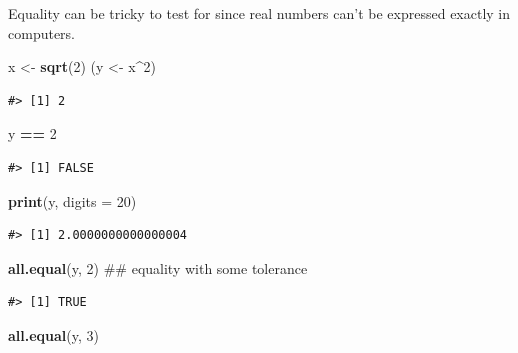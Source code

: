 \documentclass[]{book}
\newenvironment{Shaded}{\begin{snugshade}}{\end{snugshade}}
\newcommand{\KeywordTok}[1]{\textcolor[rgb]{0.13,0.29,0.53}{\textbf{#1}}}
\newcommand{\DataTypeTok}[1]{\textcolor[rgb]{0.13,0.29,0.53}{#1}}
\newcommand{\DecValTok}[1]{\textcolor[rgb]{0.00,0.00,0.81}{#1}}
\newcommand{\StringTok}[1]{\textcolor[rgb]{0.31,0.60,0.02}{#1}}
\newcommand{\OperatorTok}[1]{\textcolor[rgb]{0.81,0.36,0.00}{\textbf{#1}}}
\newcommand{\NormalTok}[1]{#1}
\theoremstyle{definition}
\theoremstyle{definition}
\theoremstyle{definition}
\theoremstyle{remark}
\begin{document}
Equality can be tricky to test for since real numbers can't be expressed
exactly in computers.

\begin{Shaded}
\begin{Highlighting}[]
\NormalTok{x <-}\StringTok{ }\KeywordTok{sqrt}\NormalTok{(}\DecValTok{2}\NormalTok{)}
\NormalTok{(y <-}\StringTok{ }\NormalTok{x}\OperatorTok{^}\DecValTok{2}\NormalTok{)}
\end{Highlighting}
\end{Shaded}

\begin{verbatim}
#> [1] 2
\end{verbatim}

\begin{Shaded}
\begin{Highlighting}[]
\NormalTok{y }\OperatorTok{==}\StringTok{ }\DecValTok{2}
\end{Highlighting}
\end{Shaded}

\begin{verbatim}
#> [1] FALSE
\end{verbatim}

\begin{Shaded}
\begin{Highlighting}[]
\KeywordTok{print}\NormalTok{(y, }\DataTypeTok{digits =} \DecValTok{20}\NormalTok{)}
\end{Highlighting}
\end{Shaded}

\begin{verbatim}
#> [1] 2.0000000000000004
\end{verbatim}

\begin{Shaded}
\begin{Highlighting}[]
\KeywordTok{all.equal}\NormalTok{(y, }\DecValTok{2}\NormalTok{)          ## equality with some tolerance}
\end{Highlighting}
\end{Shaded}

\begin{verbatim}
#> [1] TRUE
\end{verbatim}

\begin{Shaded}
\begin{Highlighting}[]
\KeywordTok{all.equal}\NormalTok{(y, }\DecValTok{3}\NormalTok{)}
\end{Highlighting}
\end{Shaded}
\end{document}
